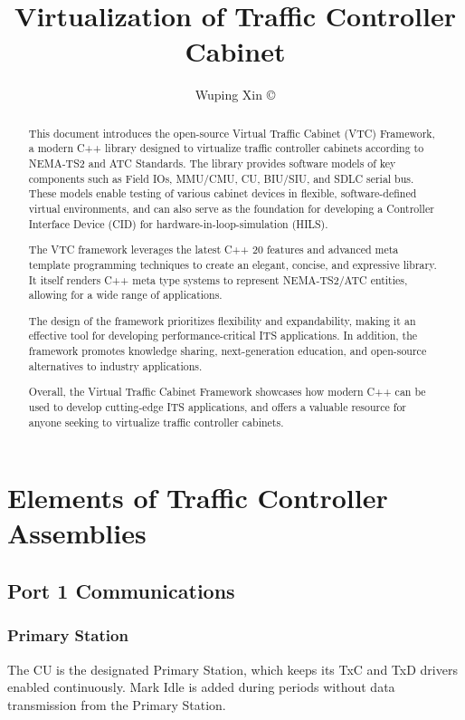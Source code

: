 \documentclass[]{article}
\title{Virtualization of Traffic Controller Cabinet}
\author{Wuping Xin ©}
\begin{document}
\maketitle

\begin{abstract}
This document introduces the open-source Virtual Traffic Cabinet (VTC) Framework, a modern C++ library designed to virtualize traffic controller cabinets according to NEMA-TS2 and ATC Standards. The library provides software models of key components such as Field IOs, MMU/CMU, CU, BIU/SIU, and SDLC serial bus. These models enable testing of various cabinet devices in flexible, software-defined virtual environments, and can also serve as the foundation for developing a Controller Interface Device (CID) for hardware-in-loop-simulation (HILS).

The VTC framework leverages the latest C++ 20 features and advanced meta template programming techniques to create an elegant, concise, and expressive library. It itself renders C++ meta type systems to represent NEMA-TS2/ATC entities, allowing for a wide range of applications.

The design of the framework prioritizes flexibility and expandability, making it an effective tool for developing performance-critical ITS applications. In addition, the framework promotes knowledge sharing, next-generation education, and open-source alternatives to industry applications.

Overall, the Virtual Traffic Cabinet Framework showcases how modern C++ can be used to develop cutting-edge ITS applications, and offers a valuable resource for anyone seeking to virtualize traffic controller cabinets.
  
\end{abstract}
\clearpage

\tableofcontents
\clearpage

\section{Elements of Traffic Controller Assemblies}

\subsection {Port 1 Communications}

\subsubsection {Primary Station}
The CU is the designated Primary Station, which keeps its TxC and TxD drivers enabled continuously. Mark Idle is added during periods without data transmission from the Primary Station. 
\end{document}
